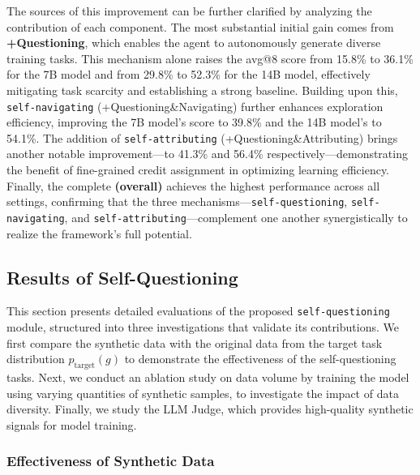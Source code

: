 The sources of this improvement can be further clarified by analyzing the contribution of each component. The most substantial initial gain comes from \textbf{+Questioning}, which enables the agent to autonomously generate diverse training tasks. This mechanism alone raises the avg@8 score from 15.8\% to 36.1\% for the 7B model and from 29.8\% to 52.3\% for the 14B model, effectively mitigating task scarcity and establishing a strong baseline. Building upon this, \texttt{self-navigating} (+Questioning\&Navigating) further enhances exploration efficiency, improving the 7B model’s score to 39.8\% and the 14B model’s to 54.1\%. The addition of \texttt{self-attributing} (+Questioning\&Attributing) brings another notable improvement—to 41.3\% and 56.4\% respectively—demonstrating the benefit of fine-grained credit assignment in optimizing learning efficiency. Finally, the complete \textbf{\AgentEvolver (overall)} achieves the highest performance across all settings, confirming that the three mechanisms—\texttt{self-questioning}, \texttt{self-navigating}, and \texttt{self-attributing}—complement one another synergistically to realize the framework’s full potential.


\subsection{Results of Self-Questioning}\label{sec:experiment_self-questionin}

This section presents detailed evaluations of the proposed \texttt{self-questioning} module, structured into three investigations that validate its contributions. We first compare the synthetic data with the original data from the target task distribution $p_{\mathrm{target}}(g)$ to demonstrate the effectiveness of the self-questioning tasks. Next, we conduct an ablation study on data volume by training the model using varying quantities of synthetic samples, to investigate the impact of data diversity. Finally, we study the LLM Judge, which provides high-quality synthetic signals for model training.

\subsubsection{Effectiveness of Synthetic Data}

